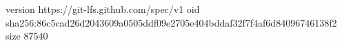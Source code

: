 version https://git-lfs.github.com/spec/v1
oid sha256:86c5cad26d2043609a0505ddf09e2705e404bddaf32f7f4af6d84096746138f2
size 87540
